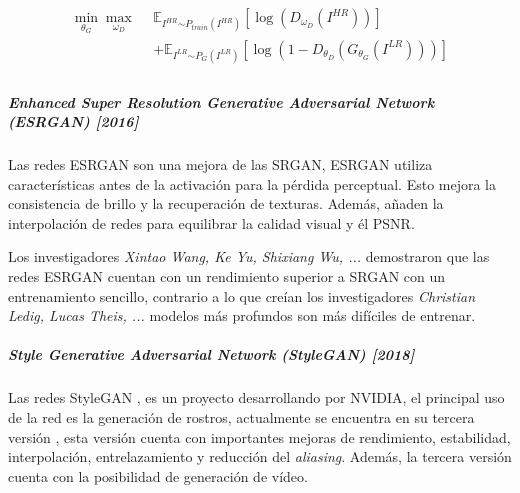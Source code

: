 \begin{equation}
    \begin{split}
        \min_{\theta_{G}}\max_{\omega_{D}}~~
        & \mathbb{E}_{I^{H R} {\sim P_{train} (I^{H R})}}  \left[ \log{(D_{\omega_{D}}(I^{H R}))}                      \right]     \\
        & + \mathbb{E}_{I^{L R} {\sim P_{G} (I^{L R})}}    \left[ \log{( 1 - D_{\theta_{D}}(G_{\theta_{G}}(I^{L R})))} \right]     \\
    \end{split}
\end{equation}


\subparagraph*{Enhanced Super Resolution Generative Adversarial Network (ESRGAN) [2016]}
Las redes \gls{ESRGAN} \cite{ESRGAN-wang2018esrgan, SRGAN-ledig2017photorealistic} son una mejora de las \gls{SRGAN}, \gls{ESRGAN} utiliza características antes de la activación para la pérdida perceptual. Esto mejora la consistencia de brillo y la recuperación de texturas. Además, añaden la interpolación de redes para equilibrar la calidad visual y él \gls{PSNR}.

Los investigadores \textit{Xintao Wang, Ke Yu, Shixiang Wu, ...}\cite{ESRGAN-wang2018esrgan} demostraron que las redes \gls{ESRGAN} cuentan con un rendimiento superior a \gls{SRGAN} con un entrenamiento sencillo, contrario a lo que creían los investigadores \textit{Christian Ledig, Lucas Theis, ...} \cite{SRGAN-ledig2017photorealistic} modelos más profundos son más difíciles de entrenar.



\subparagraph*{Style Generative Adversarial Network (StyleGAN) [2018]}

Las redes \gls{StyleGAN} \cite{StyleGAN-karras2019stylebased,StyleGAN-sauer2023stylegant}, es un proyecto desarrollando por NVIDIA, el principal uso de la red es la generación de rostros, actualmente se encuentra en su tercera versión \cite{styleGAN3-karras2021aliasfree}, esta versión cuenta con importantes mejoras de rendimiento, estabilidad, interpolación, entrelazamiento y reducción del \textit{aliasing}. Además, la tercera versión cuenta con la posibilidad de generación de vídeo.

